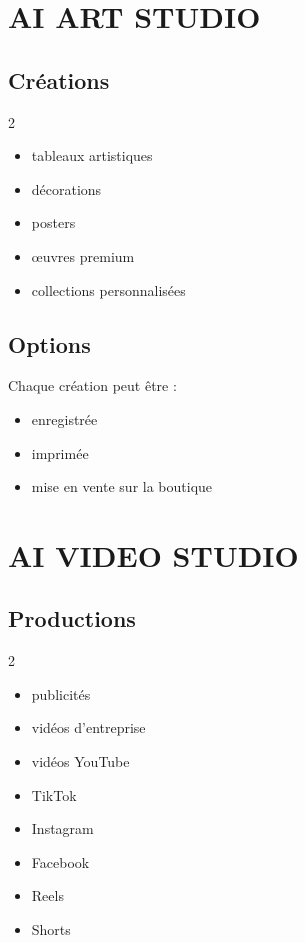 \documentclass[12pt,a4paper,oneside]{book}
\begin{document}
\chapter{AI ART STUDIO}

\section{Créations}
\begin{multicols}{2}
\begin{itemize}
\item tableaux artistiques
\item décorations
\item posters
\item œuvres premium
\item collections personnalisées
\end{itemize}
\end{multicols}

\section{Options}
Chaque création peut être :
\begin{itemize}
\item enregistrée
\item imprimée
\item mise en vente sur la boutique
\end{itemize}

\chapter{AI VIDEO STUDIO}

\section{Productions}
\begin{multicols}{2}
\begin{itemize}
\item publicités
\item vidéos d'entreprise
\item vidéos YouTube
\item TikTok
\item Instagram
\item Facebook
\item Reels
\item Shorts
\end{itemize}
\end{multicols}
\end{document}
